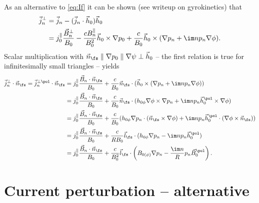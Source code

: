 As an alternative to \cref{eq:If} it can be shown (see writeup on gyrokinetics) that
\begin{align}
  \vec{j}_{n}^{\perp} &= \vec{j}_{n} - (\vec{j}_{n} \cdot \vec{h}_{0}) \vec{h}_{0} \nonumber \\
  &= j_{0}^{\parallel} \frac{\vec{B}_{n}^{\perp}}{B_{0}} - \frac{c B_{n}^{\parallel}}{B_{0}^{2}} \vec{h}_{0} \times \nabla p_{0} + \frac{c}{B_{0}} \vec{h}_{0} \times (\nabla p_{n} + \im n p_{n} \nabla \phi).
\end{align}
Scalar multiplication with $\vec{n}_{\fs} \parallel \nabla p_{0} \parallel \nabla \psi \perp \vec{h}_{0}$ -- the first relation is true for infinitesimally small triangles -- yields
\begin{align}
  \vec{j}_{n}^{\perp} \cdot \vec{n}_{\fs} = \vec{j}_{n}^{\perp \pol} \cdot \vec{n}_{\fs} &= j_{0}^{\parallel} \frac{\vec{B}_{n} \cdot \vec{n}_{\fs}}{B_{0}} + \frac{c}{B_{0}} \vec{n}_{\fs} \cdot (\vec{h}_{0} \times (\nabla p_{n} + \im n p_{n} \nabla \phi)) \nonumber \\
  &= j_{0}^{\parallel} \frac{\vec{B}_{n} \cdot \vec{n}_{\fs}}{B_{0}} + \frac{c}{B_{0}} \vec{n}_{\fs} \cdot (h_{0 \phi} \nabla \phi \times \nabla p_{n} + \im n p_{n} \vec{h}_{0}^{\pol} \times \nabla \phi) \nonumber \\
  &= j_{0}^{\parallel} \frac{\vec{B}_{n} \cdot \vec{n}_{\fs}}{B_{0}} + \frac{c}{B_{0}} (h_{0 \phi} \nabla p_{n} \cdot (\vec{n}_{\fs} \times \nabla \phi) + \im n p_{n} \vec{h}_{0}^{\pol} \cdot (\nabla \phi \times \vec{n}_{\fs})) \nonumber \\
  &= j_{0}^{\parallel} \frac{\vec{B}_{n} \cdot \vec{n}_{\fs}}{B_{0}} + \frac{c}{R B_{0}} \vec{l}_{\fs} \cdot (h_{0 \phi} \nabla p_{n} - \im n p_{n} \vec{h}_{0}^{\pol}) \nonumber \\
  &= j_{0}^{\parallel} \frac{\vec{B}_{n} \cdot \vec{n}_{\fs}}{B_{0}} + \frac{c}{B_{0}^{2}} \vec{l}_{\fs} \cdot \left( B_{0 (\phi)} \nabla p_{n} - \frac{\im n}{R} p_{n} \vec{B}_{0}^{\pol} \right). \label{eq:I3_alt}
\end{align}

\section{Current perturbation -- alternative}

